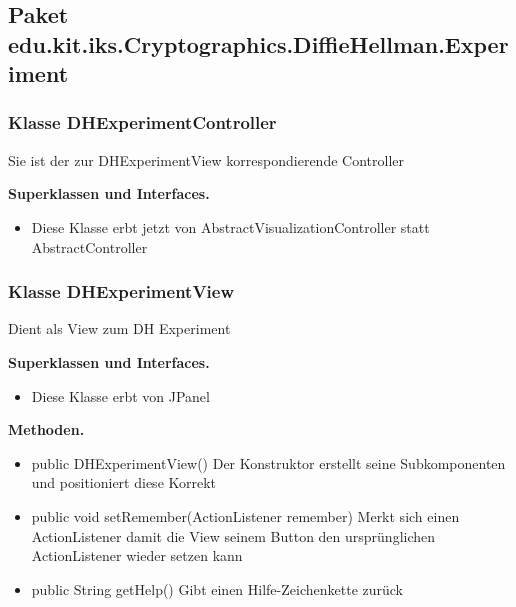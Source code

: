\documentclass{article}
\begin{document}
  \subsection{Paket edu.kit.iks.Cryptographics.DiffieHellman.Experiment}
	\subsubsection{Klasse DHExperimentController}
    Sie ist der zur DHExperimentView korrespondierende Controller\newline

	    \textbf{Superklassen und Interfaces.}\newline
        \begin{itemize}
            \item Diese Klasse erbt jetzt von AbstractVisualizationController statt AbstractController\newline
        \end{itemize}

	\subsubsection{Klasse DHExperimentView}
    Dient als View zum DH Experiment\newline
    
	    \textbf{Superklassen und Interfaces.}\newline
        \begin{itemize}
            \item Diese Klasse erbt von JPanel\newline
        \end{itemize}

    \textbf{Methoden.}\newline
	   \begin{itemize}
           \item public DHExperimentView() \newline
               Der Konstruktor erstellt seine Subkomponenten und\newline
               positioniert diese Korrekt\newline
           \item public void setRemember(ActionListener remember) \newline
               Merkt sich einen ActionListener damit die View seinem Button den ursprünglichen\newline
               ActionListener wieder setzen kann\newline
           \item public String getHelp() \newline
               Gibt einen Hilfe-Zeichenkette zurück\newline
           \end{itemize}
\end{document}
